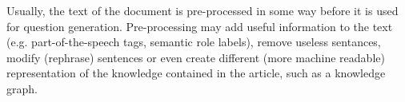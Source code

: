 \documentclass[a4paper, 12pt, twoside]{fithesis2}		%
\renewcommand{\_}{\leavevmode \kern0.07em\vbox{\hrule width0.4em}}
\begin{document}
Usually, the text of the document is pre-processed in some way before it is used for question generation.
Pre-processing may
add useful information to the text (e.g. part-of-the-speech tags, semantic role labels),
remove useless sentances, modify (rephrase) sentences or even create different (more machine readable) representation of the knowledge contained in the article, such as a knowledge graph.
\end{document}
